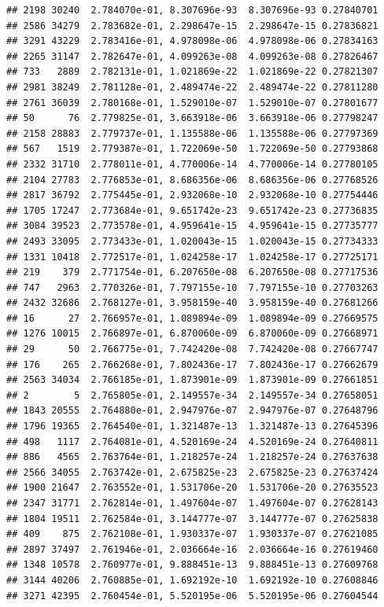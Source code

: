 \documentclass[
]{article}
\begin{document}
\begin{verbatim}
## 2198 30240  2.784070e-01, 8.307696e-93  8.307696e-93 0.27840701
## 2586 34279  2.783682e-01, 2.298647e-15  2.298647e-15 0.27836821
## 3291 43229  2.783416e-01, 4.978098e-06  4.978098e-06 0.27834163
## 2265 31147  2.782647e-01, 4.099263e-08  4.099263e-08 0.27826467
## 733   2889  2.782131e-01, 1.021869e-22  1.021869e-22 0.27821307
## 2981 38249  2.781128e-01, 2.489474e-22  2.489474e-22 0.27811280
## 2761 36039  2.780168e-01, 1.529010e-07  1.529010e-07 0.27801677
## 50      76  2.779825e-01, 3.663918e-06  3.663918e-06 0.27798247
## 2158 28883  2.779737e-01, 1.135588e-06  1.135588e-06 0.27797369
## 567   1519  2.779387e-01, 1.722069e-50  1.722069e-50 0.27793868
## 2332 31710  2.778011e-01, 4.770006e-14  4.770006e-14 0.27780105
## 2104 27783  2.776853e-01, 8.686356e-06  8.686356e-06 0.27768526
## 2817 36792  2.775445e-01, 2.932068e-10  2.932068e-10 0.27754446
## 1705 17247  2.773684e-01, 9.651742e-23  9.651742e-23 0.27736835
## 3084 39523  2.773578e-01, 4.959641e-15  4.959641e-15 0.27735777
## 2493 33095  2.773433e-01, 1.020043e-15  1.020043e-15 0.27734333
## 1331 10418  2.772517e-01, 1.024258e-17  1.024258e-17 0.27725171
## 219    379  2.771754e-01, 6.207650e-08  6.207650e-08 0.27717536
## 747   2963  2.770326e-01, 7.797155e-10  7.797155e-10 0.27703263
## 2432 32686  2.768127e-01, 3.958159e-40  3.958159e-40 0.27681266
## 16      27  2.766957e-01, 1.089894e-09  1.089894e-09 0.27669575
## 1276 10015  2.766897e-01, 6.870060e-09  6.870060e-09 0.27668971
## 29      50  2.766775e-01, 7.742420e-08  7.742420e-08 0.27667747
## 176    265  2.766268e-01, 7.802436e-17  7.802436e-17 0.27662679
## 2563 34034  2.766185e-01, 1.873901e-09  1.873901e-09 0.27661851
## 2        5  2.765805e-01, 2.149557e-34  2.149557e-34 0.27658051
## 1843 20555  2.764880e-01, 2.947976e-07  2.947976e-07 0.27648796
## 1796 19365  2.764540e-01, 1.321487e-13  1.321487e-13 0.27645396
## 498   1117  2.764081e-01, 4.520169e-24  4.520169e-24 0.27640811
## 886   4565  2.763764e-01, 1.218257e-24  1.218257e-24 0.27637638
## 2566 34055  2.763742e-01, 2.675825e-23  2.675825e-23 0.27637424
## 1900 21647  2.763552e-01, 1.531706e-20  1.531706e-20 0.27635523
## 2347 31771  2.762814e-01, 1.497604e-07  1.497604e-07 0.27628143
## 1804 19511  2.762584e-01, 3.144777e-07  3.144777e-07 0.27625838
## 409    875  2.762108e-01, 1.930337e-07  1.930337e-07 0.27621085
## 2897 37497  2.761946e-01, 2.036664e-16  2.036664e-16 0.27619460
## 1348 10578  2.760977e-01, 9.888451e-13  9.888451e-13 0.27609768
## 3144 40206  2.760885e-01, 1.692192e-10  1.692192e-10 0.27608846
## 3271 42395  2.760454e-01, 5.520195e-06  5.520195e-06 0.27604544

\end{verbatim}
\end{document}

